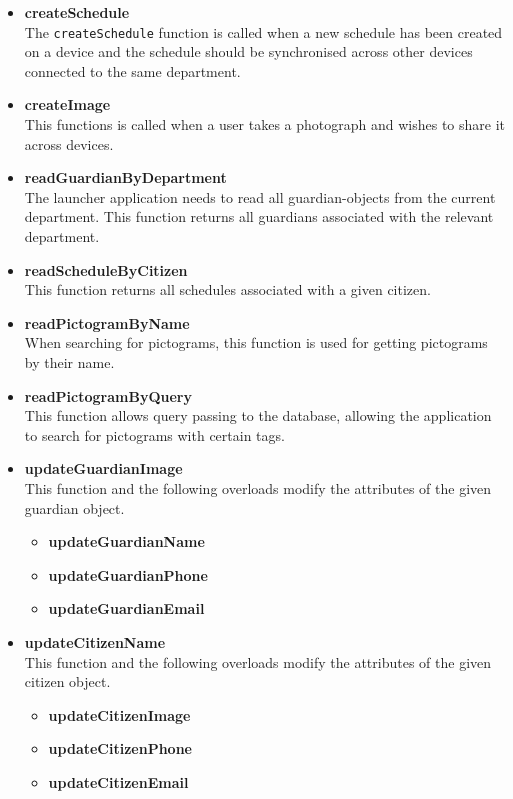 \begin{itemize}
    \item \textbf{createSchedule}\\
    The \texttt{createSchedule} function is called when a new schedule has been created on a device and the schedule should be synchronised across other devices connected to the same department.
    \item \textbf{createImage}\\
    This functions is called when a user takes a photograph and wishes to share it across devices.
    \item \textbf{readGuardianByDepartment}\\
    The launcher application needs to read all guardian-objects from the current department. This function returns all guardians associated with the relevant department.
    \item \textbf{readScheduleByCitizen}\\
    This function returns all schedules associated with a given citizen.
    \item \textbf{readPictogramByName}\\
    When searching for pictograms, this function is used for getting pictograms by their name.
    \item \textbf{readPictogramByQuery}\\
    This function allows query passing to the database, allowing the application to search for pictograms with certain tags.
    \item \textbf{updateGuardianImage}\\
    This function and the following overloads modify the attributes of the given guardian object.
    \begin{itemize}
        \item \textbf{updateGuardianName}
        \item \textbf{updateGuardianPhone}
        \item \textbf{updateGuardianEmail}
    \end{itemize}
    \item \textbf{updateCitizenName}\\
    This function and the following overloads modify the attributes of the given citizen object.
    \begin{itemize}
        \item \textbf{updateCitizenImage}
        \item \textbf{updateCitizenPhone}
        \item \textbf{updateCitizenEmail}

\end{itemize}
\end{itemize}
